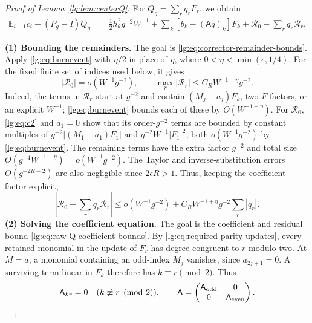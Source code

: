 \documentclass[11pt]{article}
\numberwithin{equation}{section}
\theoremstyle{remark}
\newcommand{\E}{\mathbb E}
\begin{document}
\begin{proof}[Proof of Lemma~\ref{lg:lem:centerQ}]
For $Q_g=\sum_rq_rF_r$, we obtain
\begin{equation}\label{lg:eq:corrector-coefficient-cancellation}
 \begin{aligned}
 \E_{i-1}c_i-(P_g-I)Q_g
 &=\tfrac12h_\theta^2g^{-2}W^{-1}
       +\sum_k[b_k-(\mathsf A q)_k]F_k +\mathcal R_0-\sum_rq_r\mathcal R_r.
 \end{aligned}
\end{equation}

\noindent\textbf{(1) Bounding the remainders.}
The goal is \eqref{lg:eq:corrector-remainder-bounds}.
Apply \eqref{lg:eq:burnevent} with $\eta/2$ in place of $\eta$,
where $0<\eta<\min(\epsilon,1/4)$. For the fixed finite set of
indices used below, it gives
\begin{equation}\label{lg:eq:corrector-remainder-bounds}
 |\mathcal R_0|=o(W^{-1}g^{-2}),\qquad
 \max_r|\mathcal R_r|\le C_RW^{-1+\eta}g^{-2}.
\end{equation}
Indeed, the terms in $\mathcal R_r$ start at $g^{-2}$ and contain
$(M_j-a_j)F_k$, two $F$ factors, or an explicit $W^{-1}$;
\eqref{lg:eq:burnevent} bounds each of these by $O(W^{-1+\eta})$.
For $\mathcal R_0$, \eqref{lg:eq:c2} and $a_1=0$ show that its
order-$g^{-2}$ terms are bounded by constant multiples of
$g^{-2}|(M_1-a_1)F_1|$ and $g^{-2}W^{-1}|F_1|^2$, both
$o(W^{-1}g^{-2})$ by \eqref{lg:eq:burnevent}.
The remaining terms have the extra factor $g^{-2}$ and total
size $O(g^{-4}W^{-1+\eta})=o(W^{-1}g^{-2})$.
The Taylor and inverse-substitution errors $O(g^{-2R-2})$ are
also negligible since $2\epsilon R>1$.
Thus, keeping the coefficient factor explicit,
\begin{equation}\label{lg:eq:centerdefect}
 \left|\mathcal R_0-\sum_rq_r\mathcal R_r\right|
 \le o(W^{-1}g^{-2})+C_RW^{-1+\eta}g^{-2}\sum_r|q_r|.
\end{equation}
\noindent\textbf{(2) Solving the coefficient equation.}
The goal is the coefficient and residual bound
\eqref{lg:eq:raw-Q-coefficient-bounds}.
By \eqref{lg:eq:required-parity-updates}, every retained monomial
in the update of $F_r$ has degree congruent to $r$ modulo two.
At $M=a$, a monomial containing an odd-index $M_j$ vanishes,
since $a_{2j+1}=0$. A surviving term linear in $F_k$ therefore
has $k\equiv r\pmod2$. Thus
\[
 \mathsf A_{kr}=0\quad(k\not\equiv r\pmod2),\qquad
 \mathsf A=
 \begin{pmatrix}\mathsf A_{\rm odd}&0\\0&\mathsf A_{\rm even}\end{pmatrix}.
\]


\end{proof}
\end{document}
